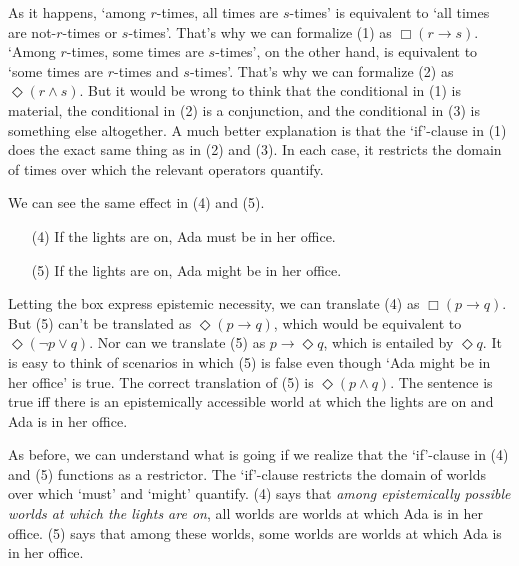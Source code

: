 As it happens, `among $r$-times, all times are $s$-times' is equivalent to `all
times are not-$r$-times or $s$-times'. That's why we can formalize (1) as
$\Box(r \to s)$. `Among $r$-times, some times are $s$-times', on the other hand,
is equivalent to `some times are $r$-times and $s$-times'. That's why we can
formalize (2) as $\Diamond(r \land s)$. But it would be wrong to think that the
conditional in (1) is material, the conditional in (2) is a conjunction, and the
conditional in (3) is something else altogether. A much better explanation is
that the `if'-clause in (1) does the exact same thing as in (2) and (3). In each
case, it restricts the domain of times over which the relevant operators
quantify.

We can see the same effect in (4) and (5).
\begin{enumerate}[leftmargin=10mm]
  \itemsep-1mm  
  \item[(4)] If the lights are on, Ada must be in her office.
  \item[(5)] If the lights are on, Ada might be in her office.
\end{enumerate}
Letting the box express epistemic necessity, we can translate (4) as
$\Box(p \to q)$. But (5) can't be translated as $\Diamond(p \to q)$, which would
be equivalent to $\Diamond(\neg p \lor q)$. Nor can we translate (5) as
$p \to \Diamond q$, which is entailed by $\Diamond q$. It is easy to think of
scenarios in which (5) is false even though `Ada might be in her office' is
true. The correct translation of (5) is $\Diamond(p \land q)$. The sentence is
true iff there is an epistemically accessible world at which the lights are on
and Ada is in her office.

As before, we can understand what is going if we realize that the
`if'-clause in (4) and (5) functions as a restrictor. The `if'-clause restricts
the domain of worlds over which `must' and `might' quantify. (4) says that
\emph{among epistemically possible worlds at which the lights are on}, all
worlds are worlds at which Ada is in her office. (5) says that among these
worlds, some worlds are worlds at which Ada is in her office.

